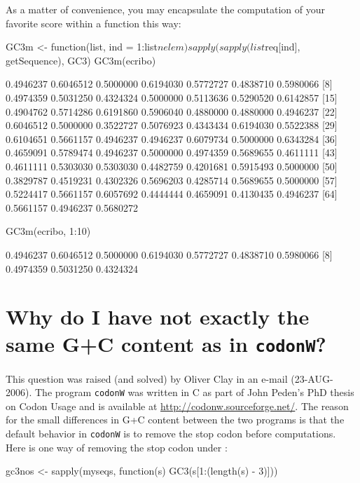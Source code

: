 \documentclass{article}
\begin{document}
As a matter of convenience, you may encapsulate the computation of your favorite score 
within a function this way:

\begin{Schunk}
\begin{Sinput}
 GC3m <- function(list, ind = 1:list$nelem) sapply(sapply(list$req[ind], 
     getSequence), GC3)
 GC3m(ecribo)
\end{Sinput}
\begin{Soutput}
 [1] 0.4946237 0.6046512 0.5000000 0.6194030 0.5772727 0.4838710 0.5980066
 [8] 0.4974359 0.5031250 0.4324324 0.5000000 0.5113636 0.5290520 0.6142857
[15] 0.4904762 0.5714286 0.6191860 0.5906040 0.4880000 0.4880000 0.4946237
[22] 0.6046512 0.5000000 0.3522727 0.5076923 0.4343434 0.6194030 0.5522388
[29] 0.6104651 0.5661157 0.4946237 0.4946237 0.6079734 0.5000000 0.6343284
[36] 0.4659091 0.5789474 0.4946237 0.5000000 0.4974359 0.5689655 0.4611111
[43] 0.4611111 0.5303030 0.5303030 0.4482759 0.4201681 0.5915493 0.5000000
[50] 0.3829787 0.4519231 0.4302326 0.5696203 0.4285714 0.5689655 0.5000000
[57] 0.5224417 0.5661157 0.6057692 0.4444444 0.4659091 0.4130435 0.4946237
[64] 0.5661157 0.4946237 0.5680272
\end{Soutput}
\begin{Sinput}
 GC3m(ecribo, 1:10)
\end{Sinput}
\begin{Soutput}
 [1] 0.4946237 0.6046512 0.5000000 0.6194030 0.5772727 0.4838710 0.5980066
 [8] 0.4974359 0.5031250 0.4324324
\end{Soutput}
\end{Schunk}

\section{Why do I have not exactly the same G+C content as in \texttt{codonW}?}

This question was raised (and solved) by Oliver Clay in an e-mail (23-AUG-2006).
The program \texttt{codonW} was written in C as part of John Peden's PhD thesis 
on Codon Usage \cite{codonW} and is available at \url{http://codonw.sourceforge.net/}.
The reason for the small differences in G+C content between the two programs is
that the default behavior in \texttt{codonW} is to remove the stop codon before
computations. Here is one way of removing the stop codon under \Rlogo{}:

\begin{Schunk}
\begin{Sinput}
 gc3nos <- sapply(myseqs, function(s) GC3(s[1:(length(s) - 
     3)]))
\end{Sinput}
\end{Schunk}
\end{document}

